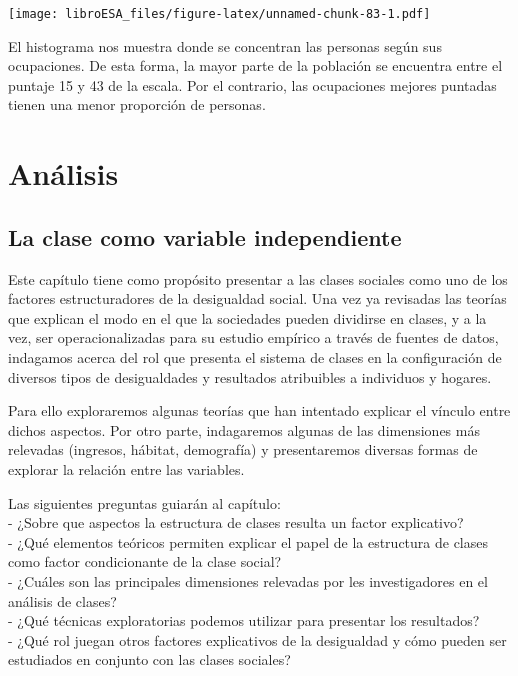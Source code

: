 \documentclass[
]{book}
\begin{document}
\texttt{[image: libroESA\_files/figure-latex/unnamed-chunk-83-1.pdf]}

El histograma nos muestra donde se concentran las personas según sus ocupaciones. De esta forma, la mayor parte de la población se encuentra entre el puntaje 15 y 43 de la escala. Por el contrario, las ocupaciones mejores puntadas tienen una menor proporción de personas.

\hypertarget{part-anuxe1lisis}{%
\part{Análisis}\label{part-anuxe1lisis}}

\hypertarget{independiente}{%
\chapter{La clase como variable independiente}\label{independiente}}

Este capítulo tiene como propósito presentar a las clases sociales como uno de los factores estructuradores de la desigualdad social. Una vez ya revisadas las teorías que explican el modo en el que la sociedades pueden dividirse en clases, y a la vez, ser operacionalizadas para su estudio empírico a través de fuentes de datos, indagamos acerca del rol que presenta el sistema de clases en la configuración de diversos tipos de desigualdades y resultados atribuibles a individuos y hogares.

Para ello exploraremos algunas teorías que han intentado explicar el vínculo entre dichos aspectos. Por otro parte, indagaremos algunas de las dimensiones más relevadas (ingresos, hábitat, demografía) y presentaremos diversas formas de explorar la relación entre las variables.

Las siguientes preguntas guiarán al capítulo:\\
- ¿Sobre que aspectos la estructura de clases resulta un factor explicativo?\\
- ¿Qué elementos teóricos permiten explicar el papel de la estructura de clases como factor condicionante de la clase social?\\
- ¿Cuáles son las principales dimensiones relevadas por les investigadores en el análisis de clases?\\
- ¿Qué técnicas exploratorias podemos utilizar para presentar los resultados?\\
- ¿Qué rol juegan otros factores explicativos de la desigualdad y cómo pueden ser estudiados en conjunto con las clases sociales?
\end{document}
